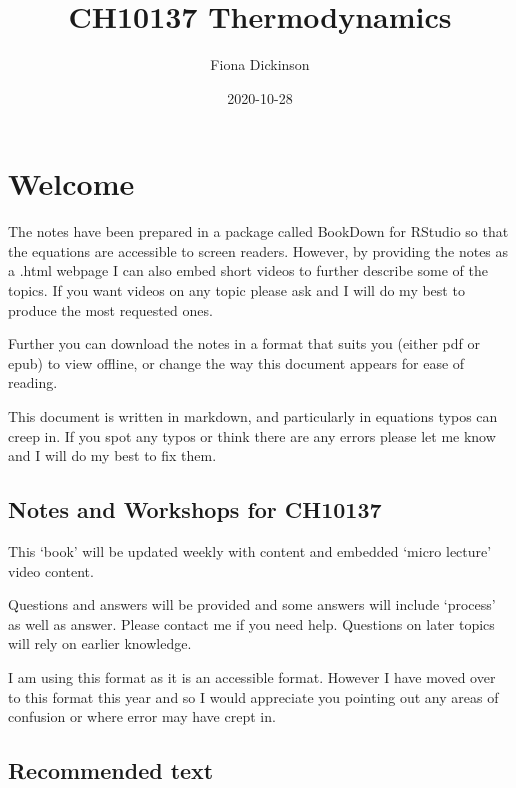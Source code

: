 \documentclass[
]{book}
\title{CH10137 Thermodynamics}
\author{Fiona Dickinson}
\date{2020-10-28}
\begin{document}
\maketitle

{
\setcounter{tocdepth}{1}
\tableofcontents
}
\hypertarget{welcome}{%
\chapter*{Welcome}\label{welcome}}

The notes have been prepared in a package called BookDown for RStudio so that the equations are accessible to screen readers. However, by providing the notes as a .html webpage I can also embed short videos to further describe some of the topics. If you want videos on any topic please ask and I will do my best to produce the most requested ones.

Further you can download the notes in a format that suits you (either pdf or epub) to view offline, or change the way this document appears for ease of reading.

This document is written in markdown, and particularly in equations typos can creep in. If you spot any typos or think there are any errors please let me know and I will do my best to fix them.

\hypertarget{notes-and-workshops-for-ch10137}{%
\section*{Notes and Workshops for CH10137}\label{notes-and-workshops-for-ch10137}}

This `book' will be updated weekly with content and embedded `micro lecture' video content.

Questions and answers will be provided and some answers will include `process' as well as answer. Please contact me if you need help. Questions on later topics will rely on earlier knowledge.

I am using this format as it is an accessible format. However I have moved over to this format this year and so I would appreciate you pointing out any areas of confusion or where error may have crept in.

\hypertarget{recommended-text}{%
\section*{Recommended text}\label{recommended-text}}
\end{document}
